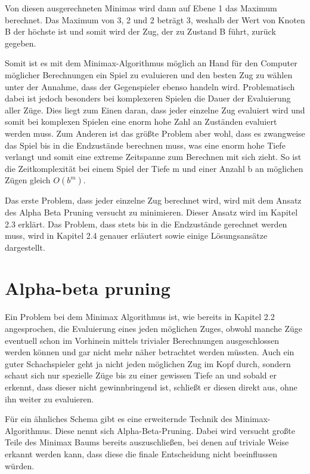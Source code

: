 Von diesen ausgerechneten Minimas wird dann auf Ebene 1 das Maximum berechnet. Das Maximum von 3, 2 und 2 beträgt 3, weshalb der Wert von Knoten B der höchste ist und somit wird der Zug, der zu Zustand B führt, zurück gegeben.

Somit ist es mit dem Minimax-Algorithmus möglich an Hand für den Computer möglicher Berechnungen ein Spiel zu evaluieren und den besten Zug zu wählen unter der Annahme, dass der Gegenspieler ebenso handeln wird. Problematisch dabei ist jedoch besonders bei komplexeren Spielen die Dauer der Evaluierung aller Züge. Dies liegt zum Einen daran, dass jeder einzelne Zug evaluiert wird und somit bei komplexen Spielen eine enorm hohe Zahl an Zuständen evaluiert werden muss. Zum Anderen ist das größte Problem aber wohl, dass es zwangweise das Spiel bis in die Endzustände berechnen muss, was eine enorm hohe Tiefe verlangt und somit eine extreme Zeitspanne zum Berechnen mit sich zieht. So ist die Zeitkomplexität bei einem Spiel der Tiefe m und einer Anzahl b an möglichen Zügen gleich $O(b^m)$.



Das erste Problem, dass jeder einzelne Zug berechnet wird, wird mit dem Ansatz des Alpha Beta Pruning versucht zu minimieren. Dieser Ansatz wird im Kapitel 2.3 erklärt. Das Problem, dass stets bis in die Endzustände gerechnet werden muss, wird in Kapitel 2.4 genauer erläutert sowie einige Lösungsansätze dargestellt.




\section{Alpha-beta pruning}

Ein Problem bei dem Minimax Algorithmus ist, wie bereits in Kapitel 2.2 angesprochen, die Evaluierung eines jeden möglichen Zuges, obwohl manche Züge eventuell schon im Vorhinein mittels trivialer Berechnungen ausgeschlossen werden können und gar nicht mehr näher betrachtet werden müssten. Auch ein guter Schachspieler geht ja nicht jeden möglichen Zug im Kopf durch, sondern schaut sich nur spezielle Züge bis zu einer gewissen Tiefe an und sobald er erkennt, dass dieser nicht gewinnbringend ist, schließt er diesen direkt aus, ohne ihn weiter zu evaluieren.

Für ein ähnliches Schema gibt es eine erweiternde Technik des Minimax-Algorithmus. Diese nennt sich Alpha-Beta-Pruning. Dabei wird versucht großte Teile des Minimax Baums bereits auszuschließen, bei denen auf triviale Weise erkannt werden kann, dass diese die finale Entscheidung nicht beeinflussen würden. 

